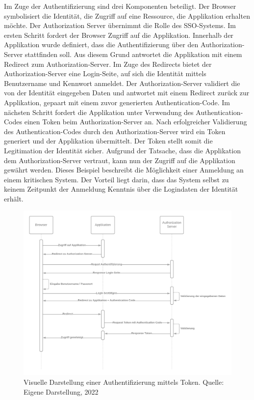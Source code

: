 Im Zuge der Authentifizierung sind drei Komponenten beteiligt. Der \glqq{}Browser\grqq{} symbolisiert die Identität, die Zugriff auf eine Ressource, die \glqq{}Applikation\grqq{} erhalten möchte. Der \glqq{}Authorization Server\grqq{} übernimmt die Rolle des SSO-Systems. Im ersten Schritt fordert der Browser Zugriff auf die Applikation. Innerhalb der Applikation wurde definiert, dass die Authentifizierung über den Authorization-Server stattfinden soll. Aus diesem Grund antwortet die Applikation mit einem Redirect zum Authorization-Server. Im Zuge des Redirects bietet der Authorization-Server eine Login-Seite, auf sich die Identität mittels Benutzername und Kennwort anmeldet. Der Authorization-Server validiert die von der Identität eingegeben Daten und antwortet mit einem Redirect zurück zur Applikation, gepaart mit einem zuvor generierten Authentication-Code. Im nächsten Schritt fordert die Applikation unter Verwendung des Authentication-Codes einen Token beim Authorization-Server an. Nach erfolgreicher Validierung des Authentication-Codes durch den Authorization-Server wird ein Token generiert und der Applikation übermittelt. Der Token stellt somit die Legitimation der Identität sicher. Aufgrund der Tatsache, dass die Applikation dem Authorization-Server vertraut, kann nun der Zugriff auf die Applikation gewährt werden. 
\bigbreak
Dieses Beispiel beschreibt die Möglichkeit einer Anmeldung an einem kritischen System. Der Vorteil liegt darin, dass das System selbst zu keinem Zeitpunkt der Anmeldung Kenntnis über die Logindaten der Identität erhält.

\begin{figure}[H]
    \centering
  \includegraphics[width=\linewidth]{images/uploads/a_figure_06.png}
  \caption{Visuelle Darstellung einer Authentifizierung mittels Token. Quelle: Eigene Darstellung, 2022}
  \label{fig:token_auth}
\end{figure}

